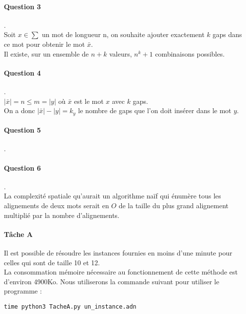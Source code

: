 \paragraph{Question 3}.\\
Soit $x \in \sum$ un mot de longueur n, on souhaite ajouter exactement $k$ gaps dans ce mot pour obtenir le mot $\bar x$.\\
Il existe, sur un ensemble de $n + k$ valeurs, $n^k+1$ combinaisons possibles.
\paragraph{Question 4}.\\
$|\bar x| = n \leq m = |y|$ où $\bar x$ est le mot $x$ avec $k$ gaps.\\
On a donc $|\bar x| - |y| = k_y$ le nombre de gaps que l'on doit insérer dans le mot $y$.
\paragraph{Question 5}.\\

\paragraph{Question 6}.\\
La complexité spatiale qu'aurait un algorithme naïf qui énumère tous les alignements de deux mots serait en $O$ de la taille du plus grand alignement multiplié par la nombre d'alignements.
\paragraph{Tâche A}
Il est possible de résoudre les instances fournies en moins d'une minute pour celles qui sont de taille 10 et 12.\\
La consommation mémoire nécessaire au fonctionnement de cette méthode est d'environ 4900Ko.
Nous utiliserons la commande suivant pour utiliser le programme :
\begin{lstlisting}
time python3 TacheA.py un_instance.adn
\end{lstlisting}

